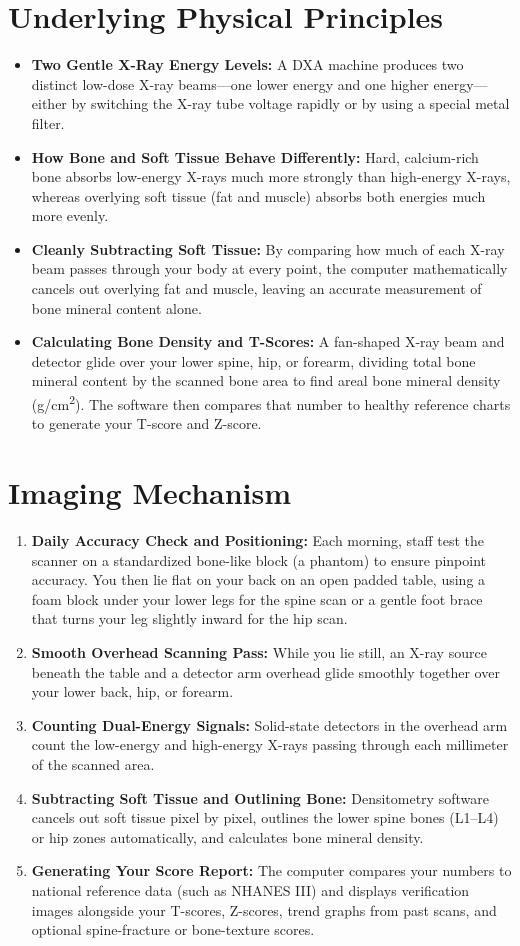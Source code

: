 \section{Underlying Physical Principles}
\begin{itemize}
\item \textbf{Two Gentle X-Ray Energy Levels:} A DXA machine produces two distinct low-dose X-ray beams---one lower energy and one higher energy---either by switching the X-ray tube voltage rapidly or by using a special metal filter.
\item \textbf{How Bone and Soft Tissue Behave Differently:} Hard, calcium-rich bone absorbs low-energy X-rays much more strongly than high-energy X-rays, whereas overlying soft tissue (fat and muscle) absorbs both energies much more evenly.
\item \textbf{Cleanly Subtracting Soft Tissue:} By comparing how much of each X-ray beam passes through your body at every point, the computer mathematically cancels out overlying fat and muscle, leaving an accurate measurement of bone mineral content alone.
\item \textbf{Calculating Bone Density and T-Scores:} A fan-shaped X-ray beam and detector glide over your lower spine, hip, or forearm, dividing total bone mineral content by the scanned bone area to find areal bone mineral density (g/cm\textsuperscript{2}). The software then compares that number to healthy reference charts to generate your T-score and Z-score.
\end{itemize}

\section{Imaging Mechanism}
\begin{enumerate}
\item \textbf{Daily Accuracy Check and Positioning:} Each morning, staff test the scanner on a standardized bone-like block (a phantom) to ensure pinpoint accuracy. You then lie flat on your back on an open padded table, using a foam block under your lower legs for the spine scan or a gentle foot brace that turns your leg slightly inward for the hip scan.
\item \textbf{Smooth Overhead Scanning Pass:} While you lie still, an X-ray source beneath the table and a detector arm overhead glide smoothly together over your lower back, hip, or forearm.
\item \textbf{Counting Dual-Energy Signals:} Solid-state detectors in the overhead arm count the low-energy and high-energy X-rays passing through each millimeter of the scanned area.
\item \textbf{Subtracting Soft Tissue and Outlining Bone:} Densitometry software cancels out soft tissue pixel by pixel, outlines the lower spine bones (L1--L4) or hip zones automatically, and calculates bone mineral density.
\item \textbf{Generating Your Score Report:} The computer compares your numbers to national reference data (such as NHANES III) and displays verification images alongside your T-scores, Z-scores, trend graphs from past scans, and optional spine-fracture or bone-texture scores.
\end{enumerate}

